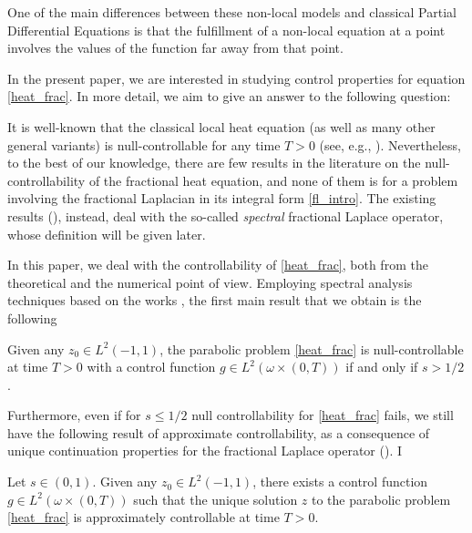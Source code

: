 One of the main differences between these non-local models and classical Partial Differential Equations is that the fulfillment of a non-local equation at a point involves the values of the function far away from that point.

In the present paper, we are interested in studying control properties for equation \eqref{heat_frac}. In more detail, we aim to give an answer to the following question:


It is well-known that the classical local heat equation (as well as many other general variants) is null-controllable for any time $T>0$ (see, e.g., \cite{fattorini1971exact,fursikov1996controllability,lebeau1995controle}). Nevertheless, to the best of our knowledge, there are few results in the literature on the null-controllability of the fractional heat equation, and none of them is for a problem involving the fractional Laplacian in its integral form \eqref{fl_intro}. The existing results (\cite{micu2006controllability,miller2006controllability}), instead, deal with the so-called \textit{spectral} fractional Laplace operator, whose definition will be given later. 

In this paper, we deal with the controllability of \eqref{heat_frac}, both from the theoretical and the numerical point of view. Employing spectral analysis techniques based on the works \cite{kulczycki2010spectral,kwasnicki2012eigenvalues}, the first main result that we obtain is the following

\begin{theorem}\label{null_control_thm}
Given any $z_0\in L^2(-1,1)$, the parabolic problem \eqref{heat_frac} is null-controllable at time $T>0$ with a control function $g\in L^2(\omega\times(0,T))$ if and only if $s>1/2$.  
\end{theorem}

Furthermore, even if for $s\leq 1/2$ null controllability for \eqref{heat_frac} fails, we still have the following result of approximate controllability, as a consequence of unique continuation properties for the fractional Laplace operator (\cite{fall2014unique}). 
I
\begin{theorem}\label{approx_control_thm}
Let $s\in(0,1)$. Given any $z_0\in L^2(-1,1)$, there exists a control function $g\in L^2(\omega\times(0,T))$ such that the unique solution $z$ to the parabolic problem \eqref{heat_frac} is approximately controllable at time $T>0$.
\end{theorem}

